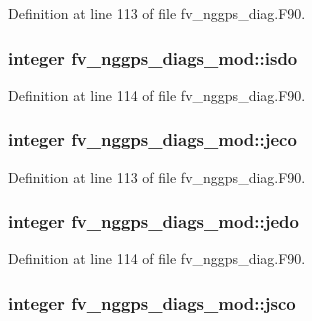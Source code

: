 Definition at line 113 of file fv\-\_\-nggps\-\_\-diag.\-F90.

\subsubsection[{isdo}]{\setlength{\rightskip}{0pt plus 5cm}integer fv\-\_\-nggps\-\_\-diags\-\_\-mod\-::isdo\hspace{0.3cm}{\ttfamily [private]}}\label{classfv__nggps__diags__mod_ac61f1b2f52e12f3e0e351d5016c2b414}


Definition at line 114 of file fv\-\_\-nggps\-\_\-diag.\-F90.

\subsubsection[{jeco}]{\setlength{\rightskip}{0pt plus 5cm}integer fv\-\_\-nggps\-\_\-diags\-\_\-mod\-::jeco\hspace{0.3cm}{\ttfamily [private]}}\label{classfv__nggps__diags__mod_a7e0188e6cd56b04d9496a771a61ab691}


Definition at line 113 of file fv\-\_\-nggps\-\_\-diag.\-F90.

\subsubsection[{jedo}]{\setlength{\rightskip}{0pt plus 5cm}integer fv\-\_\-nggps\-\_\-diags\-\_\-mod\-::jedo\hspace{0.3cm}{\ttfamily [private]}}\label{classfv__nggps__diags__mod_a5dfb7589948d6b78782b87990c55f88d}


Definition at line 114 of file fv\-\_\-nggps\-\_\-diag.\-F90.

\subsubsection[{jsco}]{\setlength{\rightskip}{0pt plus 5cm}integer fv\-\_\-nggps\-\_\-diags\-\_\-mod\-::jsco\hspace{0.3cm}{\ttfamily [private]}}\label{classfv__nggps__diags__mod_a5b3666ef22265e7fd39b94fc8c874807}


